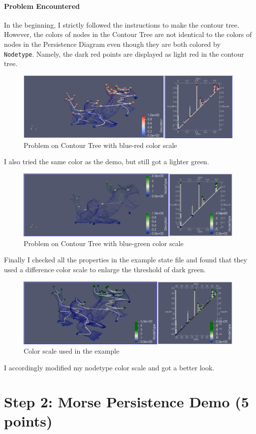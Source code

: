 \documentclass[12pt]{article}
\begin{document}
\newpage

\paragraph{Problem Encountered}
In the beginning, I strictly followed the instructions to make the contour tree. However, the colors of nodes in the Contour Tree are not identical to the colors of nodes in the Persistence Diagram even though they are both colored by \texttt{Nodetype}. Namely, the dark red points are displayed as light red in the contour tree.

\begin{figure}[h]
\centering
\includegraphics[width=0.5\linewidth]{2-1.png}
\caption{Problem on Contour Tree with blue-red color scale}
\label{fig:name}
\end{figure}

I also tried the same color as the demo, but still got a lighter green.
\begin{figure}[h]
\centering
\includegraphics[width=0.5\linewidth]{2-2.png}
\caption{Problem on Contour Tree with blue-green color scale}
\label{fig:name}
\end{figure}

Finally I checked all the properties in the example state file and found that they used a difference color scale to enlarge the threshold of dark green.
\begin{figure}[h]
\centering
\includegraphics[width=0.5\linewidth]{2-3.png}
\caption{Color scale used in the example}
\label{fig:name}
\end{figure}

I accordingly modified my nodetype color scale and got a better look.

\newpage

\section*{Step 2: Morse Persistence Demo (5 points)}
\end{document}
